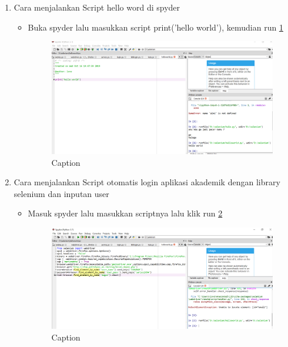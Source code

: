 \begin{enumerate}
        \item  Cara menjalankan Script hello word di spyder 
        \begin{itemize}
            \item Buka spyder lalu masukkan script print('hello world'), kemudian run \ref{capture14}
             \begin{figure}
            \centering
            \includegraphics[scale=0.3]{figures/Capture14.PNG}
            \caption{Caption}
            \label{capture14}
        \end{figure}
        \end{itemize}
        
        \item Cara menjalankan Script otomatis login aplikasi akademik dengan library selenium dan inputan user
        \begin{itemize}
            \item Masuk spyder lalu masukkan scriptnya lalu klik run \ref{capture16}
            \begin{figure} [h]
                \centering
                \includegraphics[scale=0.3]{figures/Capture16.PNG}
                \caption{Caption}
                \label{capture16}
            \end{figure}
            

\end{itemize}
\end{enumerate}
